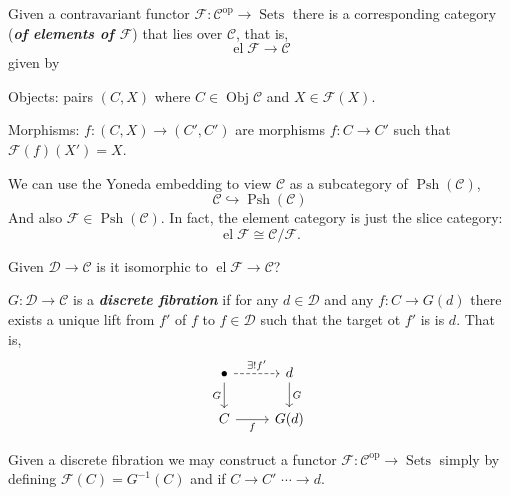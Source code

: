 \documentclass{article}
\newcommand{\Cc}{\mathcal{C}}
\newcommand{\Dc}{\mathcal{D}}
\newcommand{\Fc}{\mathcal{F}}
\DeclareMathOperator{\Obj}{Obj}
\DeclareMathOperator{\op}{op}
\DeclareMathOperator{\Psh}{Psh}
\DeclareMathOperator{\Sets}{Sets}
\DeclareMathOperator{\el}{el}
\begin{document}
\begin{defn}
	Given a contravariant functor $\Fc:\Cc^{\op}\to\Sets$ there is a corresponding category (\textbf{\textit{of elements of $\Fc$}}) that lies over $\Cc$, that is,
	\[\el\Fc\to\Cc\]
	given by
	
	Objects: pairs $(C,X)$ where $C\in\Obj\Cc$ and $X\in\Fc(X)$.
	
	Morphisms: $f:(C,X)\to(C',C')$ are morphisms $f:C\to C'$ such that $\Fc(f)(X')=X$.
\end{defn}
\begin{remark}
	We can use the Yoneda embedding to view $\Cc$ as a subcategory of $\Psh(\Cc)$,
	\[\Cc\hookrightarrow\Psh(\Cc)\]
	And also $\Fc\in\Psh(\Cc)$. In fact, the element category is just the slice category:
	\[\el\Fc\cong\Cc/\Fc.\]
\end{remark}
\begin{question}
	Given $\Dc\to\Cc$ is it isomorphic to $\el\Fc\to\Cc$?
\end{question}
\begin{defn}
	$G:\Dc\to\Cc$ is a \textbf{\textit{discrete fibration}} if for any $d\in\Dc$ and any $f:C\to G(d)$ there exists a unique lift from $f'$ of $f$ to $f\in\Dc$ such that the target ot $f'$ is is $d$. That is,
	\[\begin{tikzcd}
		\bullet\arrow[d,"G",swap]\arrow[r,"\exists!f'",dashed]&d\arrow[d,"G"]\\
		C\arrow[r,"f",swap]&G(d)
	\end{tikzcd}\]
\end{defn}
\begin{remark}
	Given a discrete fibration we may construct a functor $\Fc:\Cc^{\op}\to\Sets$ simply by defining $\Fc(C)=G^{-1}(C)$ and if $C\to C'$ $\cdots\to d$.
\end{remark}

\end{document}
